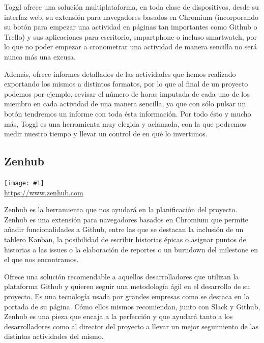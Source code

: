 \documentclass[11pt,openany]{book}
\newcommand{\logo}[2]{\medskip\begin{center}\texttt{[image: \#1]}\\\scriptsize\url{#2}\end{center}\bigskip}
\begin{document}
Toggl ofrece una solución multiplataforma, en toda clase de dispositivos, desde su interfaz web, su extensión para navegadores basados en Chromium (incorporando su botón para empezar una actividad en páginas tan importantes como Github o Trello) y sus aplicaciones para escritorio, smpartphone o incluso smartwatch, por lo que no poder empezar a cronometrar una actividad de manera sencilla no será nunca más una excusa. 

Además, ofrece informes detallados de las actividades que hemos realizado exportando los mismos a distintos formatos, por lo que al final de un proyecto podemos por ejemplo, revisar el número de horas imputada de cada uno de los miembro en cada actividad de una manera sencilla, ya que con sólo pulsar un botón tendremos un informe con toda ésta información. Por todo ésto y mucho más, Toggl es una herramienta muy elegida y aclamada, con la que podremos medir nuestro tiempo y llevar un control de en qué lo invertimos.

\subsection{Zenhub}

\logo{logos/zenhub.jpg}{https://www.zenhub.com}

Zenhub es la herramienta que nos ayudará en la planificación del proyecto. Zenhub es una extensión para navegadores basados en Chromium que permite añadir funcionalidades a Github, entre las que se destacan la inclusión de un tablero Kanban, la posibilidad de escribir historias épicas o asignar puntos de historias a las issues o la elaboración de reportes o un burndown del milestone en el que nos encontramos. 

Ofrece una solución recomendable a aquellos desarrolladores que utilizan la plataforma Github y quieren seguir una metodología ágil en el desarrollo de su proyecto. Es una tecnología usada por grandes empresas como se destaca en la portada de su página. Cómo ellos mismos recomiendan, junto con Slack y Github, Zenhub es una pieza que encaja a la perfección y que ayudará tanto a los desarrolladores como al director del proyecto a llevar un mejor seguimiento de las distintas actividades del mismo.

\end{document}
